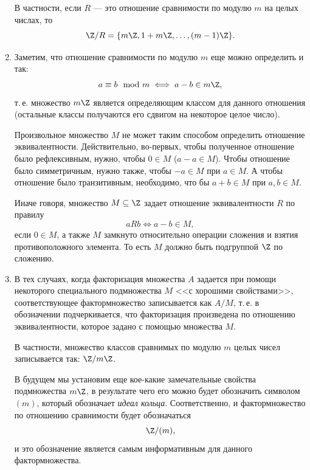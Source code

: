 \begin{enumerate}
В частности, если $R$ --- это отношение сравнимости по модулю $m$ на целых числах, то
$$
\Z/R = \{m\Z, 1+m\Z,\dots,(m-1)\Z\}.
$$

\item Заметим, что отношение сравнимости по модулю $m$ еще можно определить и так:
$$
a\equiv b\mod m\iff a-b\in m\Z,
$$
т.\,е. множество $m\Z$ является определяющим классом для данного отношения (остальные классы получаются его сдвигом на некоторое целое число).

Произвольное множество $M$ не может таким способом определить отношение эквивалентности. Действительно, во-первых, чтобы полученное отношение было рефлексивным, нужно, чтобы $0\in M$ ($a-a\in M$). Чтобы отношение было симметричным, нужно также, чтобы $-a\in M$ при $a\in M$. А чтобы отношение было транзитивным, необходимо, что бы $a+b\in M$ при $a,b\in M$.

Иначе говоря, множество $M\subseteq \Z$ задает отношение эквивалентности $R$ по правилу
$$
aRb\iff a-b\in M,
$$
если $0\in M$, а также $M$ замкнуто относительно операции сложения и взятия противоположного элемента. То есть $M$ должно быть подгруппой $\Z$ по сложению.

\item В тех случаях, когда факторизация множества $A$ задается при помощи некоторого специального подмножества $M$ <<с хорошими свойствами>>, соответствующее фактормножество записывается как $A/M$, т.\,е. в обозначении подчеркивается, что факторизация произведена по отношению эквивалентности, которое задано с помощью множества $M$.

В частности, множество классов сравнимых по модулю $m$ целых чисел записывается так: $\Z/m\Z$.

В будущем мы установим еще кое-какие замечательные свойства подмножества $m\Z$, в результате чего его можно будет обозначить символом $(m)$, который обозначает \textit{идеал кольца}. Соответственно, и фактормножество по отношению сравнимости будет обозначаться
$$
\Z/(m),
$$
и это обозначение является самым информативным для данного фактормножества.






\end{enumerate}
